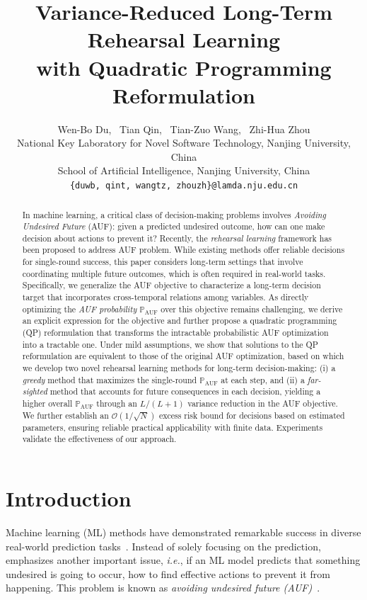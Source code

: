 \documentclass{article}
\title{Variance-Reduced Long-Term Rehearsal Learning \\ with Quadratic Programming Reformulation}
\author{%
  Wen-Bo Du,~ Tian Qin,~ Tian-Zuo Wang,~ Zhi-Hua Zhou\\
National Key Laboratory for Novel Software Technology, Nanjing University, China\\
School of Artificial Intelligence, Nanjing University, China\\
  \texttt{\{duwb, qint, wangtz, zhouzh\}@lamda.nju.edu.cn} \\
}
\theoremstyle{plain}
\theoremstyle{definition}
\theoremstyle{remark}
\def \ie {\textit{i.e.}}
\begin{document}
\maketitle

\begin{abstract}
    In machine learning, a critical class of decision-making problems involves \textit{Avoiding Undesired Future} (AUF):  
    given a predicted undesired outcome, how can one make decision about actions to prevent it?  
    Recently, the \textit{rehearsal learning} framework has been proposed to address AUF problem. 
    While existing methods offer reliable decisions for single-round success, this paper considers long-term settings that involve coordinating multiple future outcomes, which is often required in real-world tasks. 
    Specifically, we generalize the AUF objective to characterize a long-term decision target that incorporates cross-temporal relations among variables.
    As directly optimizing the \textit{AUF probability} \(\mathbb{P}_{\operatorname{AUF}}\) over this objective remains challenging, 
    we derive an explicit expression for the objective and further propose a quadratic programming (QP) reformulation that transforms the intractable probabilistic AUF optimization into a tractable one. 
    Under mild assumptions, we show that solutions to the QP reformulation are equivalent to those of the original AUF optimization, based on which we develop two novel rehearsal learning methods for long-term decision-making:
    (i) a \emph{greedy} method that maximizes the single-round \(\mathbb{P}_{\operatorname{AUF}}\) at each step, and 
    (ii) a \emph{far-sighted} method that accounts for future consequences in each decision, yielding a higher overall \(\mathbb{P}_{\operatorname{AUF}}\) through an \(L/(L+1)\) variance reduction in the AUF objective. 
    We further establish an \(\mathcal{O}(1/\sqrt{N})\) excess risk bound for decisions based on estimated parameters, ensuring reliable practical applicability with finite data.
    Experiments validate the effectiveness of our approach.
\end{abstract}


\section{Introduction}
\label{sec:intro}

Machine learning (ML) methods have demonstrated remarkable success in diverse real-world prediction tasks~\citep{lecun2015deep}.
Instead of solely focusing on the prediction, \citet*{zhouzh2022rehearsal} emphasizes another important issue, \ie, if an ML model predicts that something undesired is going to occur, how to find effective actions to prevent it from happening. 
This problem is known as \emph{avoiding undesired future (AUF)}~\citep{zhouzh2022rehearsal}.
\end{document}

